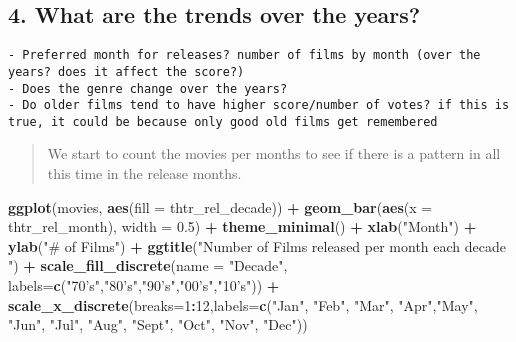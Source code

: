\documentclass[]{article}
\newenvironment{Shaded}{\begin{snugshade}}{\end{snugshade}}
\newcommand{\DataTypeTok}[1]{\textcolor[rgb]{0.13,0.29,0.53}{#1}}
\newcommand{\DecValTok}[1]{\textcolor[rgb]{0.00,0.00,0.81}{#1}}
\newcommand{\FloatTok}[1]{\textcolor[rgb]{0.00,0.00,0.81}{#1}}
\newcommand{\KeywordTok}[1]{\textcolor[rgb]{0.13,0.29,0.53}{\textbf{#1}}}
\newcommand{\NormalTok}[1]{#1}
\newcommand{\OperatorTok}[1]{\textcolor[rgb]{0.81,0.36,0.00}{\textbf{#1}}}
\newcommand{\StringTok}[1]{\textcolor[rgb]{0.31,0.60,0.02}{#1}}
\begin{document}
\hypertarget{what-are-the-trends-over-the-years-1}{%
\subsection{4. What are the trends over the
years?}\label{what-are-the-trends-over-the-years-1}}

\begin{verbatim}
- Preferred month for releases? number of films by month (over the years? does it affect the score?)
- Does the genre change over the years?
- Do older films tend to have higher score/number of votes? if this is true, it could be because only good old films get remembered
\end{verbatim}

\begin{quote}
We start to count the movies per months to see if there is a pattern in
all this time in the release months.
\end{quote}

\begin{Shaded}
\begin{Highlighting}[]
\KeywordTok{ggplot}\NormalTok{(movies, }\KeywordTok{aes}\NormalTok{(}\DataTypeTok{fill =}\NormalTok{ thtr_rel_decade)) }\OperatorTok{+}\StringTok{ }\KeywordTok{geom_bar}\NormalTok{(}\KeywordTok{aes}\NormalTok{(}\DataTypeTok{x =}\NormalTok{ thtr_rel_month), }\DataTypeTok{width =} \FloatTok{0.5}\NormalTok{) }\OperatorTok{+}\StringTok{ }\KeywordTok{theme_minimal}\NormalTok{() }\OperatorTok{+}\StringTok{ }\KeywordTok{xlab}\NormalTok{(}\StringTok{"Month"}\NormalTok{) }\OperatorTok{+}\StringTok{ }\KeywordTok{ylab}\NormalTok{(}\StringTok{"# of Films"}\NormalTok{) }\OperatorTok{+}\StringTok{ }\KeywordTok{ggtitle}\NormalTok{(}\StringTok{"Number of Films released per month each decade "}\NormalTok{) }\OperatorTok{+}\StringTok{ }\KeywordTok{scale_fill_discrete}\NormalTok{(}\DataTypeTok{name =} \StringTok{"Decade"}\NormalTok{, }\DataTypeTok{labels=}\KeywordTok{c}\NormalTok{(}\StringTok{"70's"}\NormalTok{,}\StringTok{"80's"}\NormalTok{,}\StringTok{"90's"}\NormalTok{,}\StringTok{"00's"}\NormalTok{,}\StringTok{"10's"}\NormalTok{)) }\OperatorTok{+}\StringTok{ }\KeywordTok{scale_x_discrete}\NormalTok{(}\DataTypeTok{breaks=}\DecValTok{1}\OperatorTok{:}\DecValTok{12}\NormalTok{,}\DataTypeTok{labels=}\KeywordTok{c}\NormalTok{(}\StringTok{"Jan"}\NormalTok{, }\StringTok{"Feb"}\NormalTok{, }\StringTok{"Mar"}\NormalTok{, }\StringTok{"Apr"}\NormalTok{,}\StringTok{"May"}\NormalTok{, }\StringTok{"Jun"}\NormalTok{, }\StringTok{"Jul"}\NormalTok{, }\StringTok{"Aug"}\NormalTok{, }\StringTok{"Sept"}\NormalTok{, }\StringTok{"Oct"}\NormalTok{, }\StringTok{"Nov"}\NormalTok{, }\StringTok{"Dec"}\NormalTok{))}
\end{Highlighting}
\end{Shaded}
\end{document}
